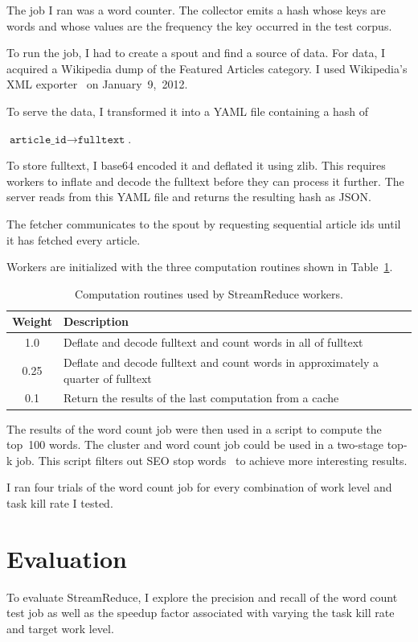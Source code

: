 \documentclass[12pt,twocolumn]{article}
\begin{document}
The job I ran was a word counter. The collector emits a hash whose keys are words and
whose
values are the frequency the key occurred in the test corpus.

To run the job, I had to create a spout and find a source of data. For data, I acquired a
Wikipedia dump of the Featured Articles category. I used Wikipedia's XML
exporter~\cite{wikipedia:special:export} on January~9,~2012.

To serve the data, I transformed it into a YAML file containing a hash of
\begin{center}
$\texttt{article\_id}\rightarrow\texttt{fulltext}$.
\end{center}

To store fulltext, I base64 encoded it and
deflated it using zlib. This requires workers to inflate and decode the fulltext before they
can process it further. The server reads from this YAML file and returns the resulting hash as
JSON.

The fetcher communicates to the spout by requesting sequential article ids until it has
fetched
every article.

Workers are initialized with the three computation routines shown in
Table~\ref{table:workerTasks}.

\begin{table}
\begin{tabularx}{\linewidth}{|c|X|}
 \hline
Weight & Description \\ \hline
1.0 & Deflate and decode fulltext and count words in all of fulltext \\ \hline
0.25 & Deflate and decode fulltext and count words in approximately a quarter of fulltext \\
\hline
0.1 & Return the results of the last computation from a cache \\ \hline
\end{tabularx}
\caption{Computation routines used by StreamReduce workers.}
\label{table:workerTasks}
\end{table}

The results of the word count job were then used in a script to compute the top~100 words.
The cluster and word count job could be used in a two-stage top-k job. This script filters
out SEO stop words~\cite{stopwords} to achieve more interesting results.

I ran four trials of the word count job for every combination of work level and task kill
rate I tested.

\section{Evaluation}
\label{sec:evaluation}
To evaluate StreamReduce, I explore the precision and recall of the word count test job as
well as the
speedup factor associated with varying the task kill rate and target work level.
\end{document}
